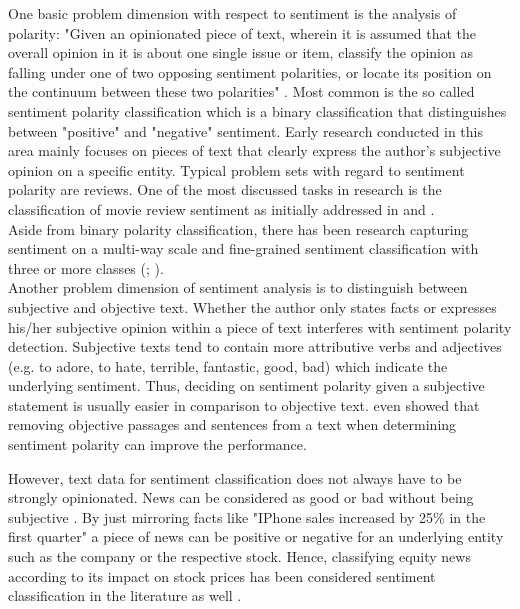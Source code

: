 \documentclass[a4paper,12pt]{article}%
\begin{document}
One basic problem dimension with respect to sentiment is the analysis of polarity: "Given an opinionated piece of text, wherein it is assumed that the overall opinion in it is about one single issue or item, classify the opinion as falling under one of two opposing sentiment polarities, or locate its position on the continuum between these two polarities" \citep{Pang.2008}. Most common is the so called sentiment polarity classification which is a binary classification that distinguishes between "positive" and "negative" sentiment. Early research conducted in this area mainly focuses on pieces of text that clearly express the author's subjective opinion on a specific entity. Typical problem sets with regard to sentiment polarity are reviews. One of the most discussed tasks in research is the classification of movie review sentiment as initially addressed in \citet{Pang2002} and \citet{Turney2002}.\\

Aside from binary polarity classification, there has been research capturing sentiment on a multi-way scale \citep{Snyder2007a} and fine-grained sentiment classification with three or more classes (\cite{Pang2005}; \cite{Socher2013}).\\

Another problem dimension of sentiment analysis is to distinguish between subjective and objective text. Whether the author only states facts or expresses his/her subjective opinion within a piece of text interferes with sentiment polarity detection. Subjective texts tend to contain more attributive verbs and adjectives (e.g. to adore, to hate, terrible, fantastic, good, bad) which indicate the underlying sentiment. Thus, deciding on sentiment polarity given a subjective statement is usually easier in comparison to objective text. \citet{Pang2004} even showed that removing objective passages and sentences from a text when determining sentiment polarity can improve the performance.

However, text data for sentiment classification does not always have to be strongly opinionated. News can be considered as good or bad without being subjective \citep{Pang.2008}. By just mirroring facts like "IPhone sales increased by 25\% in the first quarter" a piece of news can be positive or negative for an underlying entity such as the company or the respective stock. Hence, classifying equity news according to its impact on stock prices has been considered sentiment classification in the literature as well \citep{Koppel2006}.\\
\end{document}
